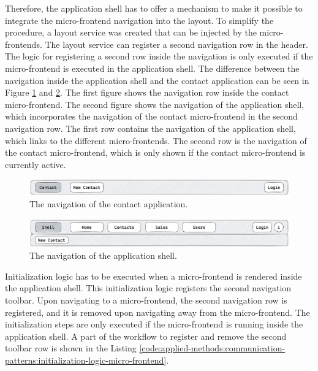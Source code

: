 \noindent Therefore, the application shell has to offer a mechanism to make it possible to integrate the micro-frontend navigation into the layout. To simplify the procedure, a layout service was created that can be injected by the micro-frontends. The layout service can register a second navigation row in the header. The logic for registering a second row inside the navigation is only executed if the micro-frontend is executed in the application shell. The difference between the navigation inside the application shell and the contact application can be seen in Figure \ref{fig:applied-methods:communication-patterns:contact-application-header} and \ref{fig:applied-methods:communication-patterns:application-shell-header}. The first figure shows the navigation row inside the contact micro-frontend. The second figure shows the navigation of the application shell, which incorporates the navigation of the contact micro-frontend in the second navigation row. The first row contains the navigation of the application shell, which links to the different micro-frontends. The second row is the navigation of the contact micro-frontend, which is only shown if the contact micro-frontend is currently active.

\ifshowImages
  \begin{figure}[H]
  \centering
  \includegraphics[width=1\linewidth]{images/applied-methods/communication-patterns/contact-header.png}
  \caption{The navigation of the contact application.}\label{fig:applied-methods:communication-patterns:contact-application-header}
  \end{figure}
\fi

\ifshowImages
  \begin{figure}[H]
  \centering
  \includegraphics[width=1\linewidth]{images/applied-methods/communication-patterns/host-contact-header.png}
  \caption{The navigation of the application shell.}\label{fig:applied-methods:communication-patterns:application-shell-header}
  \end{figure}
\fi

\noindent Initialization logic has to be executed when a micro-frontend is rendered inside the application shell. This initialization logic registers the second navigation toolbar. Upon navigating to a micro-frontend, the second navigation row is registered, and it is removed upon navigating away from the micro-frontend. The initialization steps are only executed if the micro-frontend is running inside the application shell. A part of the workflow to register and remove the second toolbar row is shown in the Listing \ref{code:applied-methods:communication-patterns:initialization-logic-micro-frontend}.


